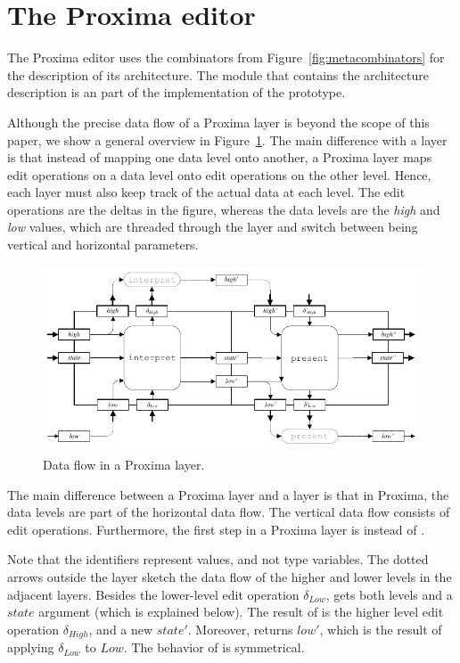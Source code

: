 \documentclass[preprint,natbib]{sigplanconf}
\begin{document}
							
%																
\section{The Proxima editor} \label{sect:proxima}


The Proxima editor uses the combinators from Figure~\ref{fig:metacombinators}  for the description of its architecture. The module that contains the architecture description is an part of the implementation of the prototype. 

Although the precise data flow of a Proxima layer is beyond the scope of this paper, we show a general overview in Figure~\ref{proximaDataFlow}. The main difference with a  layer is that instead of mapping one data level onto another, a Proxima layer maps edit operations on a data level onto edit operations on the other level. Hence, each layer must also keep track of the actual data at each level. The edit operations are the deltas in the figure, whereas the data levels are the {\em high} and {\em low} values, which are threaded through the layer and switch between being vertical and horizontal parameters. 


\begin{figure}
\includegraphics[width=\columnwidth]{images/LayerDataFlow}
\caption{Data flow in a Proxima layer.} \label{proximaDataFlow}
\end{figure}



\bc
The main difference between a Proxima layer and a  layer is that in Proxima, the data levels are part of the horizontal data flow. The vertical data flow consists of edit operations. Furthermore, the first step in a Proxima layer is  instead of .

Note that the identifiers represent values, and not type variables. The dotted arrows outside the layer sketch the data flow of the higher and lower levels in the adjacent layers. Besides the lower-level edit operation $\delta_{Low}$,  gets both levels and a $state$ argument (which is explained below). The result of  is the higher level edit operation $\delta_{High}$, and a new $state'$. Moreover,  returns $low'$, which is the result of applying $\delta_{Low}$ to $Low$. The behavior of  is symmetrical.
\end{document}
